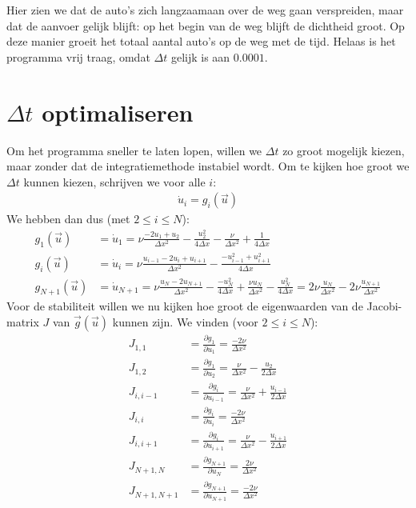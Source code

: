 \documentclass{article}
\newcommand{\Dt}{\Delta t}
\begin{document}
Hier zien we dat de auto's zich langzaamaan over de weg gaan verspreiden, maar dat de aanvoer gelijk blijft: op het begin van de weg blijft de dichtheid groot.
Op deze manier groeit het totaal aantal auto's op de weg met de tijd.
Helaas is het programma vrij traag, omdat $\Dt$ gelijk is aan $0.0001$.

\newpage
\section*{$\Dt$ optimaliseren}
Om het programma sneller te laten lopen, willen we $\Dt
$ zo groot mogelijk kiezen, maar zonder dat de integratiemethode instabiel wordt.
Om te kijken hoe groot we $\Dt$ kunnen kiezen, schrijven we voor alle $i$:
\begin{align*}
\dot{u}_i =g_i(\vec{u})
\end{align*}
We hebben dan dus (met $2\leq i \leq N$):
\begin{align*}
g_1(\vec{u})&=\dot{u}_1 = \nu \frac{-2u_1+u_2}{\Delta x^2} -\frac{u_2^2}{4\Delta x} -\frac{\nu}{\Delta x^2} +\frac{1}{4\Delta x}\\
g_i(\vec{u})&=\dot{u}_i = \nu \frac{u_{i-1}-2u_i+u_{i+1}}{\Delta x^2} -\frac{-u_{i-1}^2+u_{i+1}^2}{4\Delta x}\\
g_{N+1}(\vec{u})&=\dot{u}_{N+1} = \nu \frac{u_{N}-2u_{N+1}}{\Delta x^2} -\frac{-u_N^2}{4\Delta x} +\frac{\nu u_N}{\Delta x^2} -\frac{u_N^2}{4\Delta x}
=2\nu \frac{u_N}{\Delta x^2} -2\nu\frac{u_{N+1}}{\Delta x^2}
\end{align*}
Voor de stabiliteit willen we nu kijken hoe groot de eigenwaarden van de Jacobi-matrix $J$ van $\vec{g}(\vec{u})$ kunnen zijn.
We vinden (voor $2\leq i\leq N$):
\begin{align*}
J_{1,1} &= \frac{\partial g_1}{\partial u_1} = \frac{-2\nu}{\Delta x^2}\\
J_{1,2} &= \frac{\partial g_1}{\partial u_2} = \frac{\nu}{\Delta x^2} -\frac{u_2}{2\Delta x}\\
J_{i,i-1} &= \frac{\partial g_i}{\partial u_{i-1}} = \frac{\nu}{\Delta x^2}+\frac{u_{i-1}}{2\Delta x}\\
J_{i,i} &= \frac{\partial g_i}{\partial u_i} = \frac{-2\nu}{\Delta x^2}\\
J_{i,i+1} &= \frac{\partial g_i}{\partial u_{i+1}} = \frac{\nu}{\Delta x^2} -\frac{u_{i+1}}{2\Delta x}\\
J_{N+1,N} &= \frac{\partial g_{N+1}}{\partial u_N} =  \frac{2\nu}{\Delta x^2}\\
J_{N+1,N+1} &= \frac{\partial g_{N+1}}{\partial u_{N+1}} = \frac{-2\nu}{\Delta x^2}
\end{align*}
\end{document}
